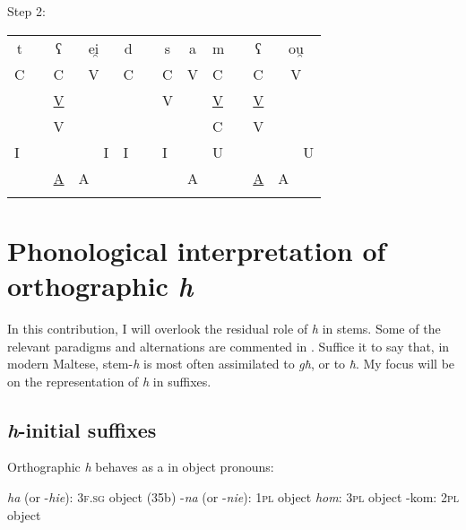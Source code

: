 \documentclass[output=paper]{langsci/langscibook}
\begin{document}
\ex
Step 2: 



\begin{tabularx}{\textwidth}{|p{4mm}|p{4mm}|p{4mm}|p{4mm}|p{4mm}|p{4mm}| c |p{4mm}|p{4mm}|p{4mm}|p{4mm}|p{4mm}|p{4mm}|p{4mm}|} 
\multicolumn{1}{c}{t} & \multicolumn{1}{c}{} & \multicolumn{1}{c}{ ʕ} & \multicolumn{2}{c}{ ei̯ }& \multicolumn{1}{c}{ d} & \multicolumn{1}{c}{} & \multicolumn{1}{c}{ s} & \multicolumn{1}{c}{ a} & \multicolumn{1}{c}{ m} & \multicolumn{1}{c}{} & \multicolumn{1}{c}{ ʕ} & \multicolumn{2}{c}{ ou̯ }\\
 
\hhline{------~-------}
 C &  & C & \multicolumn{2}{c|}{ V} & C &  & C & V & C &  & C & \multicolumn{2}{c|}{ V}\\
&  & \underline{V} & \multicolumn{2}{|c|}{} &  &  & V &  & \underline{V} &  & \underline{V} & \multicolumn{2}{c|}{}\\
&  & V & \multicolumn{2}{c|}{} &  &  &  &  & C &  & V & \multicolumn{2}{c|}{}\\
\hhline{------~-------}
 I &  &  &  & I & I &  & I &  & U &  &  &  & U\\
&  & \underline{A} & A &  &  &  &  & A &  &  & \underline{A} & A & \\
\hhline{------~-------} 
\end{tabularx}
\z
\z

\section{Phonological interpretation of orthographic \textit{h}}

In this contribution, I will overlook the residual role of \textit{h} in stems. Some of the relevant paradigms and alternations are commented in \citet[67]{Camilleri2014}. Suffice it to say that, in modern Maltese, stem-\textit{h} is most often assimilated to \textit{għ}, or to \textit{ħ}. My focus will be on the representation of \textit{h} in suffixes.

\subsection{\textit{h}-initial suffixes}

Orthographic \textit{h} behaves as a  in object pronouns:

\ea\label{ex:puech:35}%
  \ea\textit{ha} (or -\textit{hie}):  3\textsc{f.sg} object  (35b)  -\textit{na} (or -\textit{nie}):  1\textsc{pl} object
  \ex\textit{hom}:    3\textsc{pl} object     -kom:  2\textsc{pl} object
  \z
\z
\end{document}
